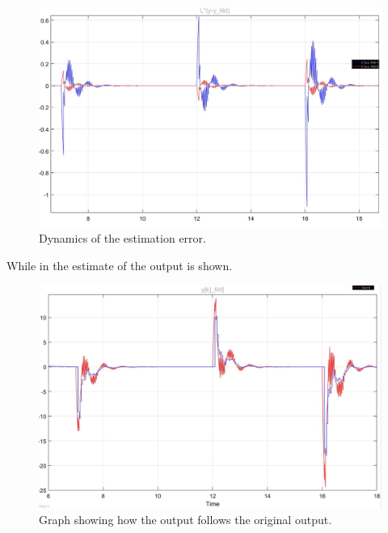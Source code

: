 \begin{figure}[H]
\centering
\includegraphics[width=1\textwidth]{rapport/billeder/temporary/errortozero}
\caption{Dynamics of the estimation error.}
\label{fig:errorzero}
\end{figure}

While in  the estimate of the output is shown. 

\begin{figure}[H]
\centering
\includegraphics[width=1\textwidth]{rapport/billeder/temporary/outputcomparison}
\caption{Graph showing how the output follows the original output.}
\label{fig:est_out}
\end{figure}